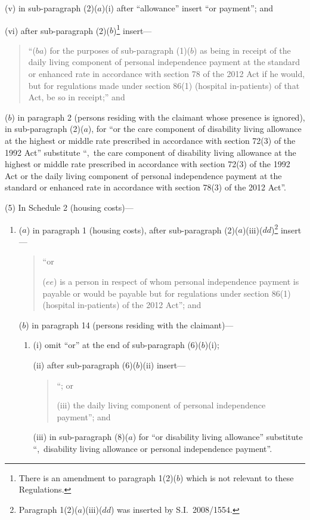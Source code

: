 \documentclass[12pt,a4paper]{article}
\begin{document}
\begin{enumerate}
\begin{enumerate}
(v) in sub-paragraph (2)($a$)(i)  after “allowance” insert “or payment”; and

(vi) after sub-paragraph (2)($b$)\footnote{There is an amendment to paragraph 1(2)($b$)  which is not relevant to these Regulations.} insert—
\begin{quotation}
“($ba$) for the purposes of sub-paragraph (1)($b$)  as being in receipt of the daily living component of personal independence payment at the standard or enhanced rate in accordance with section 78 of the 2012 Act if he would, but for regulations made under section 86(1) (hospital in-patients) of that Act, be so in receipt;” and
\end{quotation}
\end{enumerate}

($b$) in paragraph 2 (persons residing with the claimant whose presence is ignored), in sub-paragraph (2)($a$), for “or the care component of disability living allowance at the highest or middle rate prescribed in accordance with section 72(3) of the 1992 Act” substitute “,~the care component of disability living allowance at the highest or middle rate prescribed in accordance with section 72(3) of the 1992 Act or the daily living component of personal independence payment at the standard or enhanced rate in accordance with section 78(3) of the 2012 Act”.
\end{enumerate}

(5) In Schedule 2 (housing costs)—
\begin{enumerate}\item[]
($a$) in paragraph 1 (housing costs), after sub-paragraph (2)($a$)(iii)($dd$)\footnote{Paragraph 1(2)($a$)(iii)($dd$)  was inserted by S.I.~2008/1554.} insert—
\begin{quotation}
“or

($ee$) is a person in respect of whom personal independence payment is payable or would be payable but for regulations under section 86(1) (hospital in-patients) of the 2012 Act”; and
\end{quotation}

($b$) in paragraph 14 (persons residing with the claimant)—
\begin{enumerate}\item[]
(i) omit “or” at the end of sub-paragraph (6)($b$)(i);

(ii) after sub-paragraph (6)($b$)(ii)  insert—
\begin{quotation}
“; or

(iii) the daily living component of personal independence payment”; and
\end{quotation}

(iii) in sub-paragraph (8)($a$)  for “or disability living allowance” substitute “,~disability living allowance or personal independence payment”.
\end{enumerate}
\end{enumerate}
\end{document}
